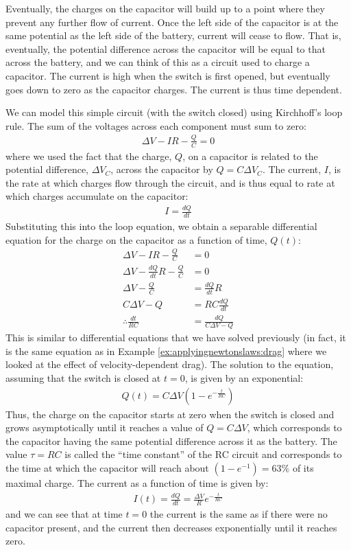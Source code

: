 Eventually, the charges on the capacitor will build up to a point where they prevent any further flow of current. Once the left side of the capacitor is at the same potential as the left side of the battery, current will cease to flow. That is, eventually, the potential difference across the capacitor will be equal to that across the battery, and we can think of this as a circuit used to charge a capacitor. The current is high when the switch is first opened, but eventually goes down to zero as the capacitor charges. The current is thus time dependent. 

We can model this simple circuit (with the switch closed) using Kirchhoff's loop rule. The sum of the voltages across each component must sum to zero:
\begin{align*}
\Delta V - IR - \frac{Q}{C} = 0
\end{align*}
where we used the fact that the charge, $Q$, on a capacitor is related to the potential difference, $\Delta V_C$, across the capacitor by $Q=C\Delta V_C$. The current, $I$, is the rate at which charges flow through the circuit, and is thus equal to rate at which charges accumulate on the capacitor:
\begin{align*}
I=\frac{dQ}{dt}
\end{align*}
Substituting this into the loop equation, we obtain a separable differential equation for the charge on the capacitor as a function of time, $Q(t)$:
\begin{align*}
\Delta V - IR - \frac{Q}{C} &= 0\\
\Delta V - \frac{dQ}{dt}R - \frac{Q}{C} &= 0\\
\Delta V - \frac{Q}{C} &= \frac{dQ}{dt}R\\
C\Delta V - Q &= RC\frac{dQ}{dt}\\
\therefore \frac{dt}{RC}&=\frac{dQ}{C\Delta V - Q }
\end{align*}
This is similar to differential equations that we have solved previously (in fact, it is the same equation as in Example \ref{ex:applyingnewtonslaws:drag} where we looked at the effect of velocity-dependent drag). The solution to the equation, assuming that the switch is closed at $t=0$, is given by an exponential:
\begin{align*}
Q(t) = C\Delta V\left( 1 - e^{-\frac{t}{RC}} \right)
\end{align*}
Thus, the charge on the capacitor starts at zero when the switch is closed and grows asymptotically until it reaches a value of $Q=C\Delta V$, which corresponds to the capacitor having the same potential difference across it as the battery. The value $\tau=RC$ is called the ``time constant'' of the RC circuit and corresponds to the time at which the capacitor will reach about $(1-e^{-1})=63\%$ of its maximal charge. The current as a function of time is given by:
\begin{align*}
I(t)=\frac{dQ}{dt}=\frac{\Delta V}{R}e^{-\frac{t}{RC}}
\end{align*}
and we can see that at time $t=0$ the current is the same as if there were no capacitor present, and the current then decreases exponentially until it reaches zero.
\newpage
